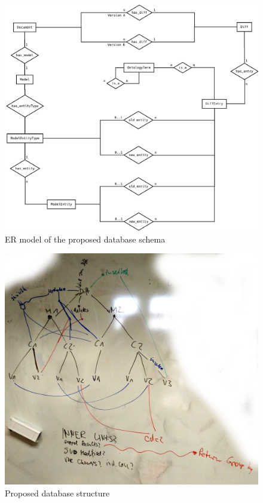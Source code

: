 \begin{figure}
	\centering
	\includegraphics[width=\textwidth]{resources/db-concept-er.pdf}
	\caption{ER model of the proposed database schema}
	\label{fig:db-er-model}
\end{figure}

\begin{figure}[h]
	\includegraphics[width=\textwidth]{resources/db_structure.jpg}
	\caption{Proposed database structure}
	\label{fig:db-model}
\end{figure}
